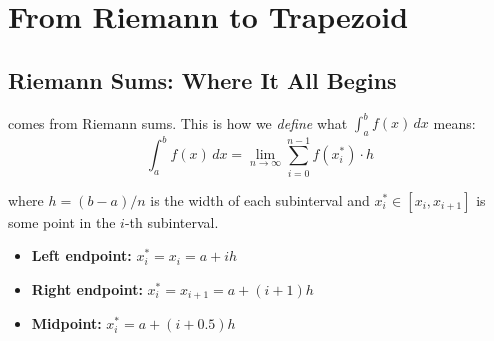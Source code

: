 
\newpage
\section{From Riemann to Trapezoid}

\subsection{Riemann Sums: Where It All Begins}

 comes from Riemann sums. This is how we \emph{define} what $\int_a^b f(x)\,dx$ means:
\begin{equation}
    \int_a^b f(x) \, dx = \lim_{n \to \infty} \sum_{i=0}^{n-1} f(x_i^*) \cdot h
\end{equation}

where $h = (b-a)/n$ is the width of each subinterval and $x_i^* \in [x_i, x_{i+1}]$ is some point in the $i$-th subinterval.


\begin{itemize}
    \item \textbf{Left endpoint:} $x_i^* = x_i = a + ih$
    \item \textbf{Right endpoint:} $x_i^* = x_{i+1} = a + (i+1)h$
    \item \textbf{Midpoint:} $x_i^* = a + (i + 0.5)h$
\end{itemize}

